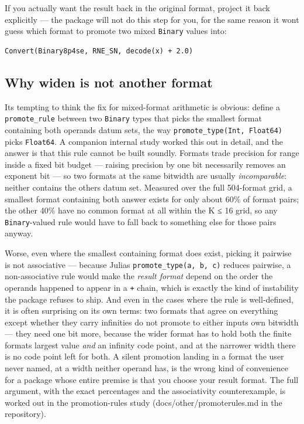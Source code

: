 If you actually want the result back in the original format, project it back explicitly — the package will not do this step for you, for the same reason it won{\textquotesingle}t guess which format to promote two mixed \texttt{Binary} values into:




\nopagebreak[4]
\begin{verbatim}
Convert(Binary8p4se, RNE_SN, decode(x) + 2.0)
\end{verbatim}



\subsection{Why widen is not another format}



\label{6193834797985144004}{}


It{\textquotesingle}s tempting to think the fix for mixed-format arithmetic is obvious: define a \texttt{promote\_\allowbreak{}rule} between two \texttt{Binary} types that picks the smallest format containing both operands{\textquotesingle} datum sets, the way \texttt{promote\_\allowbreak{}type(\allowbreak{}Int, Float64)} picks \texttt{Float64}. A companion internal study worked this out in detail, and the answer is that this rule cannot be built soundly. Formats trade precision for range inside a fixed bit budget — raising precision by one bit necessarily removes an exponent bit — so two formats at the same bitwidth are usually \emph{incomparable}: neither contains the other{\textquotesingle}s datum set. Measured over the full 504-format grid, a {\textquotedbl}smallest format containing both{\textquotedbl} answer exists for only about 60\% of format pairs; the other 40\% have no common format at all within the K ≤ 16 grid, so any \texttt{Binary}-valued rule would have to fall back to something else for those pairs anyway.



Worse, even where the smallest containing format does exist, picking it pairwise is not associative — because Julia{\textquotesingle}s \texttt{promote\_\allowbreak{}type(a, b, c)} reduces pairwise, a non-associative rule would make the \emph{result format} depend on the order the operands happened to appear in a \texttt{+} chain, which is exactly the kind of instability the package refuses to ship. And even in the cases where the rule is well-defined, it is often surprising on its own terms: two formats that agree on everything except whether they carry infinities do not promote to either input{\textquotesingle}s own bitwidth — they need one bit more, because the wider format has to hold both the finite format{\textquotesingle}s largest value \emph{and} an infinity code point, and at the narrower width there is no code point left for both. A silent promotion landing in a format the user never named, at a width neither operand has, is the wrong kind of convenience for a package whose entire premise is that you choose your result format. The full argument, with the exact percentages and the associativity counterexample, is worked out in the promotion-rules study (docs/other/promoterules.md in the repository).



